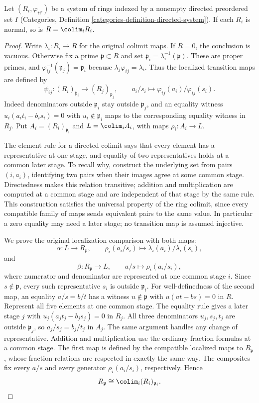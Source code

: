 \begin{lemma}
\label{editorial-source-lemma-colimit-normal-ring}
Let $(R_i,\varphi_{ii'})$ be a system of rings indexed by a nonempty
directed preordered set $I$
(Categories, Definition \ref{categories-definition-directed-system}).
If each $R_i$ is normal, so is
$R = \colim_i R_i$.
\end{lemma}

\begin{proof}
Write $\lambda_i:R_i\to R$ for the original colimit maps.
If $R=0$, the conclusion is vacuous. Otherwise fix a prime
$\mathfrak p\subset R$ and set
$\mathfrak p_i=\lambda_i^{-1}(\mathfrak p)$.
These are proper primes, and
$\varphi_{ij}^{-1}(\mathfrak p_j)=\mathfrak p_i$ because
$\lambda_j\varphi_{ij}=\lambda_i$.
Thus the localized transition maps are defined by
$$
\psi_{ij}:(R_i)_{\mathfrak p_i}\longrightarrow(R_j)_{\mathfrak p_j},
\qquad a_i/s_i\longmapsto
\varphi_{ij}(a_i)/\varphi_{ij}(s_i).
$$
Indeed denominators outside $\mathfrak p_i$ stay outside
$\mathfrak p_j$, and an equality witness
$u_i(a_it_i-b_is_i)=0$ with $u_i\notin\mathfrak p_i$
maps to the corresponding equality witness in $R_j$.
Put $A_i=(R_i)_{\mathfrak p_i}$ and $L=\colim_i A_i$,
with maps $\rho_i:A_i\to L$.

The element rule for a directed colimit says that every element
has a representative at one stage, and equality of two representatives
holds at a common later stage. To recall why, construct the underlying
set from pairs $(i,a_i)$, identifying two pairs when their images
agree at some common stage. Directedness makes this relation
transitive; addition and multiplication are computed at a common
stage and are independent of that stage by the same rule.
This construction satisfies the universal property of the ring
colimit, since every compatible family of maps sends equivalent
pairs to the same value. In particular a zero equality may need
a later stage; no transition map is assumed injective.

We prove the original localization comparison with both maps:
$$
\alpha:L\longrightarrow R_{\mathfrak p},\qquad
\rho_i(a_i/s_i)\longmapsto
\lambda_i(a_i)/\lambda_i(s_i),
$$
and
$$
\beta:R_{\mathfrak p}\longrightarrow L,\qquad
a/s\longmapsto\rho_i(a_i/s_i),
$$
where numerator and denominator are represented at one common
stage $i$. Since $s\notin\mathfrak p$, every such representative
$s_i$ is outside $\mathfrak p_i$. For well-definedness of the
second map, an equality $a/s=b/t$ has a witness
$u\notin\mathfrak p$ with $u(at-bs)=0$ in $R$.
Represent all five elements at one common stage. The equality
rule gives a later stage $j$ with
$u_j(a_jt_j-b_js_j)=0$ in $R_j$.
All three denominators $u_j,s_j,t_j$ are outside
$\mathfrak p_j$, so $a_j/s_j=b_j/t_j$ in $A_j$.
The same argument handles any change of representative.
Addition and multiplication use the ordinary fraction formulas
at a common stage. The first map is defined by the compatible
localized maps to $R_{\mathfrak p}$, whose fraction relations
are respected in exactly the same way.
The composites fix every $a/s$ and every generator
$\rho_i(a_i/s_i)$, respectively. Hence
$$
R_{\mathfrak p}\cong\colim_i(R_i)_{\mathfrak p_i}.
$$


\end{proof}
